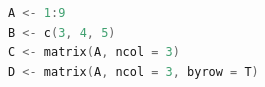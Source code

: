 \begin{lstlisting}[language=c++,label={code:09_01},caption={ベクトルデータの保持}]
A <- 1:9
B <- c(3, 4, 5)
C <- matrix(A, ncol = 3)
D <- matrix(A, ncol = 3, byrow = T)
\end{lstlisting}
